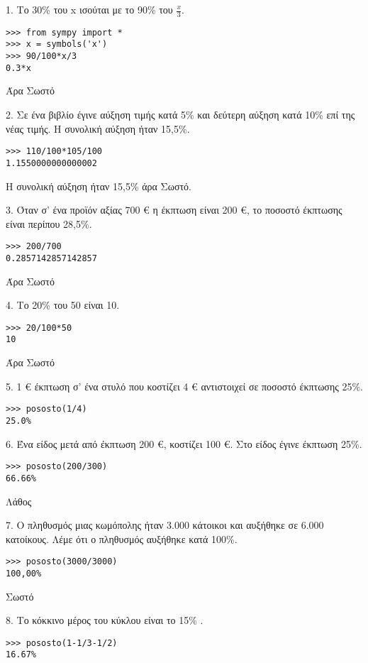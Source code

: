 \begin{exercise}
1. Το 30\% του x ισούται με το 90\% του $\frac{x}{3}$.
\end{exercise}
\begin{lstlisting}
>>> from sympy import *
>>> x = symbols('x')
>>> 90/100*x/3
0.3*x
\end{lstlisting}
Άρα Σωστό
\begin{exercise}
2. Σε ένα βιβλίο έγινε αύξηση τιμής κατά 5\% και δεύτερη αύξηση
κατά 10\% επί της νέας τιμής. Η συνολική αύξηση ήταν 15,5\%.
\end{exercise}
\begin{lstlisting}
>>> 110/100*105/100
1.1550000000000002
\end{lstlisting}
Η συνολική αύξηση ήταν 15,5\% άρα Σωστό.
\begin{exercise}
3. Όταν σ’ ένα προϊόν αξίας 700 € η έκπτωση είναι 200 €, το
ποσοστό έκπτωσης είναι περίπου 28,5\%.
\end{exercise}
\begin{lstlisting}
>>> 200/700
0.2857142857142857
\end{lstlisting}
Άρα Σωστό
\begin{exercise}
4. Το 20\% του 50 είναι 10.
\end{exercise}
\begin{lstlisting}
>>> 20/100*50
10
\end{lstlisting}
Άρα Σωστό
\begin{exercise}
5. 1 € έκπτωση σ’ ένα στυλό που κοστίζει 4 € αντιστοιχεί σε ποσοστό
έκπτωσης 25\%.
\end{exercise}
\begin{lstlisting}
>>> pososto(1/4)
25.0%
\end{lstlisting}
\begin{exercise}
6. Ένα είδος μετά από έκπτωση 200 €, κοστίζει 100 €. Στο είδος έγινε
έκπτωση 25\%.
\end{exercise}
\begin{lstlisting}
>>> pososto(200/300)
66.66%
\end{lstlisting}
Λάθος
\begin{exercise}
7. Ο πληθυσμός μιας κωμόπολης ήταν 3.000 κάτοικοι και αυξήθηκε σε
6.000 κατοίκους. Λέμε ότι ο πληθυσμός αυξήθηκε κατά 100\%.
\end{exercise}
\begin{lstlisting}
>>> pososto(3000/3000)
100,00%
\end{lstlisting}
Σωστό
\begin{exercise}
8. Το κόκκινο μέρος του κύκλου είναι το 15\% .
\end{exercise}
\begin{lstlisting}
>>> pososto(1-1/3-1/2)
16.67%
\end{lstlisting}

